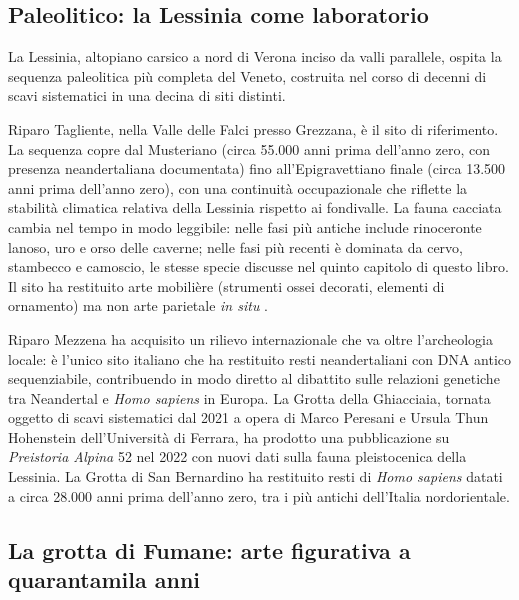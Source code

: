 \subsection{Paleolitico: la Lessinia come laboratorio}

La Lessinia, altopiano carsico a nord di Verona inciso da valli parallele, ospita la sequenza paleolitica più completa del Veneto, costruita nel corso di decenni di scavi sistematici in una decina di siti distinti.

Riparo Tagliente, nella Valle delle Falci presso Grezzana, è il sito di riferimento. La sequenza copre dal Musteriano (circa 55.000 anni prima dell'anno zero, con presenza neandertaliana documentata) fino all'Epigravettiano finale (circa 13.500 anni prima dell'anno zero), con una continuità occupazionale che riflette la stabilità climatica relativa della Lessinia rispetto ai fondivalle. La fauna cacciata cambia nel tempo in modo leggibile: nelle fasi più antiche include rinoceronte lanoso, uro e orso delle caverne; nelle fasi più recenti è dominata da cervo, stambecco e camoscio, le stesse specie discusse nel quinto capitolo di questo libro. Il sito ha restituito arte mobilière (strumenti ossei decorati, elementi di ornamento) ma non arte parietale \emph{in situ} \citep{bartolomei1992}.

Riparo Mezzena ha acquisito un rilievo internazionale che va oltre l'archeologia locale: è l'unico sito italiano che ha restituito resti neandertaliani con DNA antico sequenziabile, contribuendo in modo diretto al dibattito sulle relazioni genetiche tra Neandertal e \emph{Homo sapiens} in Europa. La Grotta della Ghiacciaia, tornata oggetto di scavi sistematici dal 2021 a opera di Marco Peresani e Ursula Thun Hohenstein dell'Università di Ferrara, ha prodotto una pubblicazione su \emph{Preistoria Alpina} 52 nel 2022 con nuovi dati sulla fauna pleistocenica della Lessinia. La Grotta di San Bernardino ha restituito resti di \emph{Homo sapiens} datati a circa 28.000 anni prima dell'anno zero, tra i più antichi dell'Italia nordorientale.

\subsection{La grotta di Fumane: arte figurativa a quarantamila anni}

